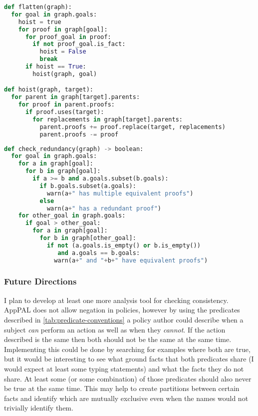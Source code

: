 \documentclass[a4paper]{scrartcl}
\begin{document}
\begin{lstlisting}[language=Python,float,caption={Procedure for flattening the redundancy graph.},label={alg:flatten}]
def flatten(graph):
  for goal in graph.goals:
    hoist = true
    for proof in graph[goal]:
      for proof_goal in proof:
        if not proof_goal.is_fact:
          hoist = False
          break
      if hoist == True:
        hoist(graph, goal)

def hoist(graph, target):
  for parent in graph[target].parents:
    for proof in parent.proofs:
      if proof.uses(target):
        for replacements in graph[target].parents:
          parent.proofs += proof.replace(target, replacements)
          parent.proofs -= proof
\end{lstlisting}

\begin{lstlisting}[language=Python,float,caption={Procedure to check for redundancy.},label={alg:redundancy}]
def check_redundancy(graph) -> boolean:
  for goal in graph.goals:
    for a in graph[goal]:
      for b in graph[goal]:
        if a >= b and a.goals.subset(b.goals):
          if b.goals.subset(a.goals):
            warn(a+" has multiple equivalent proofs")
          else
            warn(a+" has a redundant proof")
    for other_goal in graph.goals:
      if goal > other_goal:
        for a in graph[goal]:
          for b in graph[other_goal]:
            if not (a.goals.is_empty() or b.is_empty())
               and a.goals == b.goals:
              warn(a+" and "+b+" have equivalent proofs")
\end{lstlisting}

\subsubsection*{Future Directions}

I plan to develop at least one more analysis tool for checking consistency.
AppPAL does not allow negation in policies, however by using the predicates
described in \autoref{tab:predicate-conventions} a policy author could describe
when a subject \emph{can} perform an action as well as when they \emph{cannot}.
If the action described is the same then both should not be the same at the same
time.  Implementing this could be done by searching for examples where both are
true, but it would be interesting to see what ground facts that both
predicates share (I would expect at least some typing statements) and
what the facts they do not share.  At least some (or some combination) of those
predicates should also never be true at the same time.  This may help to create
partitions between certain facts and identify which are mutually exclusive even
when the names would not trivially identify them.
\end{document}
